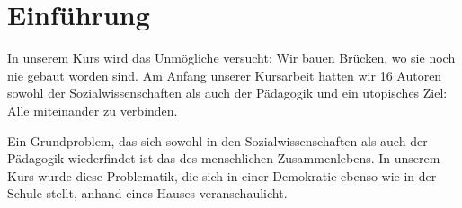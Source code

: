 
\section{Einführung}
In unserem Kurs wird das Unmögliche versucht:
Wir bauen Brücken, wo sie noch nie gebaut worden sind.
Am Anfang unserer Kursarbeit hatten wir 16 Autoren sowohl der Sozialwissenschaften als auch der Pädagogik und ein utopisches Ziel: Alle miteinander zu verbinden.

Ein Grundproblem, das sich sowohl in den Sozialwissenschaften als auch der Pädagogik wiederfindet ist das des menschlichen Zusammenlebens.
In unserem Kurs wurde diese Problematik, die sich in einer Demokratie ebenso wie in der Schule stellt, anhand eines Hauses veranschaulicht.

